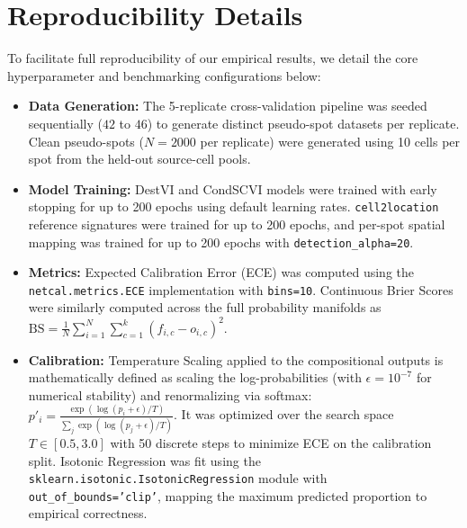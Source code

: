 \documentclass{jmlr} %
\begin{document}
\section{Reproducibility Details}
\label{app:reproducibility}
To facilitate full reproducibility of our empirical results, we detail the core hyperparameter and benchmarking configurations below:
\begin{itemize}
    \item \textbf{Data Generation:} The 5-replicate cross-validation pipeline was seeded sequentially ($42$ to $46$) to generate distinct pseudo-spot datasets per replicate. Clean pseudo-spots ($N=2000$ per replicate) were generated using 10 cells per spot from the held-out source-cell pools.
    \item \textbf{Model Training:} DestVI and CondSCVI models were trained with early stopping for up to 200 epochs using default learning rates. \texttt{cell2location} reference signatures were trained for up to 200 epochs, and per-spot spatial mapping was trained for up to 200 epochs with \texttt{detection\_alpha=20}.
    \item \textbf{Metrics:} Expected Calibration Error (ECE) was computed using the \texttt{netcal.metrics.ECE} implementation with \texttt{bins=10}. Continuous Brier Scores were similarly computed across the full probability manifolds as $\text{BS} = \frac{1}{N} \sum_{i=1}^{N} \sum_{c=1}^{k} (f_{i,c} - o_{i,c})^2$.
    \item \textbf{Calibration:} Temperature Scaling applied to the compositional outputs is mathematically defined as scaling the log-probabilities (with $\epsilon=10^{-7}$ for numerical stability) and renormalizing via softmax: $p'_i = \frac{\exp(\log(p_i + \epsilon) / T)}{\sum_j \exp(\log(p_j + \epsilon) / T)}$. It was optimized over the search space $T \in [0.5, 3.0]$ with 50 discrete steps to minimize ECE on the calibration split. Isotonic Regression was fit using the \texttt{sklearn.isotonic.IsotonicRegression} module with \texttt{out\_of\_bounds='clip'}, mapping the maximum predicted proportion to empirical correctness.
\end{itemize}
\end{document}
